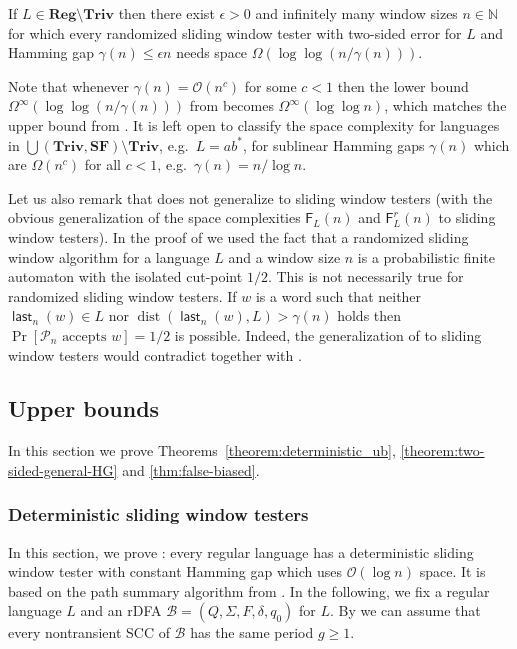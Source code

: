 \documentclass{theoretics}
\newcommand{\N}{\mathbb{N}}
\newcommand{\B}{\mathcal{B}}
\renewcommand{\O}{\mathcal{O}}
\renewcommand{\P}{\mathcal{P}}
\newcommand{\F}{\mathsf{F}}
\DeclareMathOperator{\last}{\mathsf{last}}
\DeclareMathOperator{\dist}{dist}
\newcommand{\Reg}{\mathbf{Reg}}
\newcommand{\Triv}{\mathbf{Triv}}
\newcommand{\SF}{\mathbf{SF}}
\renewcommand{\geq}{\geqslant}
\renewcommand{\leq}{\leqslant}
\renewcommand{\le}{\leq}
\newcommand{\Omegainf}{\Omega^{\scriptscriptstyle{\infty}}}
\begin{document}
\begin{theorem} \label{lemma-loglog(n-gamma)}
If $L \in \Reg \setminus \Triv$ then there exist $\epsilon > 0$ and infinitely many window sizes $n \in \N$ for which
every randomized sliding window tester with two-sided error for $L$ and Hamming gap $\gamma(n) \le \epsilon n$ needs space $\Omega(\log\log(n/\gamma(n)))$.
\end{theorem}
Note that whenever $\gamma(n) = \O(n^c)$ for some $c < 1$ then the lower bound 
$\Omegainf(\log\log(n/\gamma(n)))$ from  becomes 
$\Omegainf(\log \log n)$, which matches the upper bound from .
It is left open to classify the space complexity for languages in $\bigcup(\Triv, \SF) \setminus \Triv$, e.g.\ $L = ab^*$,
for sublinear Hamming gaps $\gamma(n)$ which are $\Omega(n^c)$ for all $c < 1$, e.g.\ $\gamma(n) =  n/\log n$.

Let us also remark that  does not generalize to sliding window testers (with the obvious generalization of the space complexities
$\F_L(n)$ and $\F_L^r(n)$ to sliding window testers). In the proof of  we used the fact that a randomized sliding window algorithm
for a language $L$ and a window size $n$ is a probabilistic finite automaton with the isolated cut-point $1/2$. This is not necessarily true for 
randomized sliding window testers. If $w$ is a word such that neither  $\last_n(w) \in L$ nor $\dist(\last_n(w),L) > \gamma(n)$ holds then 
$\Pr[\P_n \text{ accepts } w] = 1/2$ is possible. Indeed, the generalization of  to sliding window testers would
contradict  together with .


\subsection{Upper bounds}

In this section we prove Theorems~\ref{theorem:deterministic_ub}, \ref{theorem:two-sided-general-HG} and \ref{thm:false-biased}.

\subsubsection{Deterministic sliding window testers}

In this section, we prove : every regular language has a deterministic sliding window tester
with constant Hamming gap which uses $\O(\log n)$ space.
It is based on the path summary algorithm from .
In the following, we fix a regular language $L$ and an rDFA $\B = (Q,\Sigma,F,\delta,q_0)$ for $L$.
By  we can assume that every nontransient SCC
of $\B$ has the same period $g \geq 1$.
\end{document}
